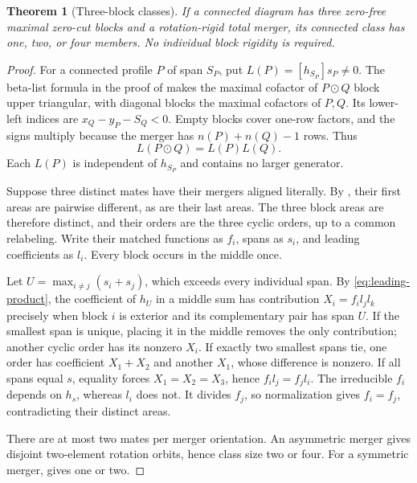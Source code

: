 \documentclass[11pt,a4paper]{amsart}
\numberwithin{equation}{section}
\theoremstyle{plain}
\newtheorem{theorem}{Theorem}[section]
\theoremstyle{definition}
\begin{document}
\begin{theorem}[Three-block classes]\label{thm:three-block-classes}
If a connected diagram has three zero-free maximal zero-cut blocks and a rotation-rigid total merger, its connected class has one, two, or four members.  No individual block rigidity is required.
\end{theorem}
\begin{proof}
For a connected profile \(P\) of span \(S_P\), put \(L(P)=[h_{S_P}]s_P\ne0\).  The beta-list formula in the proof of  makes the maximal cofactor of \(P\odot Q\) block upper triangular, with diagonal blocks the maximal cofactors of \(P,Q\).  Its lower-left indices are \(x_Q-y_P-S_Q<0\).  Empty blocks cover one-row factors, and the signs multiply because the merger has \(n(P)+n(Q)-1\) rows.  Thus
\begin{equation}\label{eq:leading-product}
 L(P\odot Q)=L(P)L(Q).
\end{equation}
Each \(L(P)\) is independent of \(h_{S_P}\) and contains no larger generator.

Suppose three distinct mates have their mergers aligned literally.  By , their first areas are pairwise different, as are their last areas.  The three block areas are therefore distinct, and their orders are the three cyclic orders, up to a common relabeling.  Write their matched functions as \(f_i\), spans as \(s_i\), and leading coefficients as \(l_i\).  Every block occurs in the middle once.

Let \(U=\max_{i\ne j}(s_i+s_j)\), which exceeds every individual span.  By \eqref{eq:leading-product}, the coefficient of \(h_U\) in a middle sum has contribution \(X_i=f_i l_jl_k\) precisely when block \(i\) is exterior and its complementary pair has span \(U\).  If the smallest span is unique, placing it in the middle removes the only contribution; another cyclic order has its nonzero \(X_i\).  If exactly two smallest spans tie, one order has coefficient \(X_1+X_2\) and another \(X_1\), whose difference is nonzero.  If all spans equal \(s\), equality forces \(X_1=X_2=X_3\), hence \(f_i l_j=f_j l_i\).  The irreducible \(f_i\) depends on \(h_s\), whereas \(l_i\) does not.  It divides \(f_j\), so normalization gives \(f_i=f_j\), contradicting their distinct areas.

There are at most two mates per merger orientation.  An asymmetric merger gives disjoint two-element rotation orbits, hence class size two or four.  For a symmetric merger,  gives one or two.
\end{proof}
\end{document}
